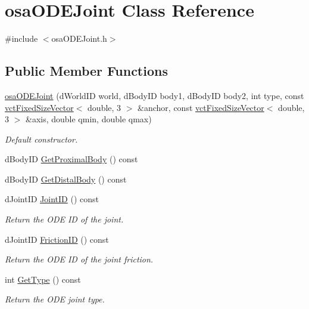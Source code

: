 \hypertarget{classosa_o_d_e_joint}{\section{osa\-O\-D\-E\-Joint Class Reference}
\label{classosa_o_d_e_joint}
}


{\ttfamily \#include $<$osa\-O\-D\-E\-Joint.\-h$>$}

\subsection*{Public Member Functions}
\begin{DoxyCompactItemize}
\item 
\hyperlink{classosa_o_d_e_joint_a01489275c6a1ab57359f49e189f10d07}{osa\-O\-D\-E\-Joint} (d\-World\-I\-D world, d\-Body\-I\-D body1, d\-Body\-I\-D body2, int type, const \hyperlink{classvct_fixed_size_vector}{vct\-Fixed\-Size\-Vector}$<$ double, 3 $>$ \&anchor, const \hyperlink{classvct_fixed_size_vector}{vct\-Fixed\-Size\-Vector}$<$ double, 3 $>$ \&axis, double qmin, double qmax)
\begin{DoxyCompactList}\small\item\em Default constructor. \end{DoxyCompactList}\item 
d\-Body\-I\-D \hyperlink{classosa_o_d_e_joint_ada594795933cf305745653e45da24139}{Get\-Proximal\-Body} () const 
\item 
d\-Body\-I\-D \hyperlink{classosa_o_d_e_joint_ace39db9584bc1426f42dc7385d591cc7}{Get\-Distal\-Body} () const 
\item 
d\-Joint\-I\-D \hyperlink{classosa_o_d_e_joint_a22c29049b63c6bcb3b0a356619a406d4}{Joint\-I\-D} () const 
\begin{DoxyCompactList}\small\item\em Return the O\-D\-E I\-D of the joint. \end{DoxyCompactList}\item 
d\-Joint\-I\-D \hyperlink{classosa_o_d_e_joint_a627b7b5970fb1dda011cd3799fd07d38}{Friction\-I\-D} () const 
\begin{DoxyCompactList}\small\item\em Return the O\-D\-E I\-D of the joint friction. \end{DoxyCompactList}\item 
int \hyperlink{classosa_o_d_e_joint_a03d31a848567b0c2e83cc6d6a69c33a0}{Get\-Type} () const 
\begin{DoxyCompactList}\small\item\em Return the O\-D\-E joint type. \end{DoxyCompactList}\item 

\end{DoxyCompactItemize}
